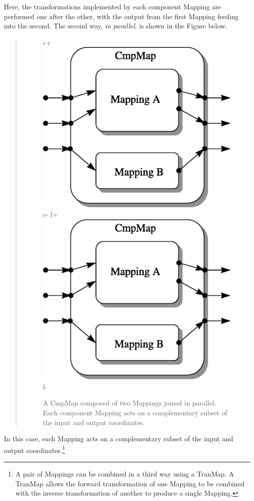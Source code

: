 \documentclass[twoside,11pt]{article}
\begin{document}
\begin{htmlonly}
   Here, the transformations implemented by each component Mapping are
   performed one after the other, with the output from the first Mapping
   feeding into the second.  The second way, {\em{in parallel,}} is shown in
   the Figure below.
   \begin{quote}
   \begin{figure}
   \label{fig:parallelcmpmap}
c+
   \includegraphics[scale=1.0]{sun211_figures/parallel.eps}
c-
f+
   \includegraphics[scale=1.0]{sun210_figures/parallel.eps}
f-
   \caption{A CmpMap composed of two Mappings joined in parallel. Each
   component Mapping acts on a complementary subset of the input and
   output coordinates.}
   \end{figure}
   \end{quote}
\end{htmlonly}
In this case, each Mapping acts on a complementary subset of the
input and output coordinates.\footnote{A pair of Mappings can be combined
in a third way using a TranMap. A TranMap allows the forward
transformation of one Mapping to be combined with the inverse
transformation of another to produce a single Mapping.}
\end{document}
